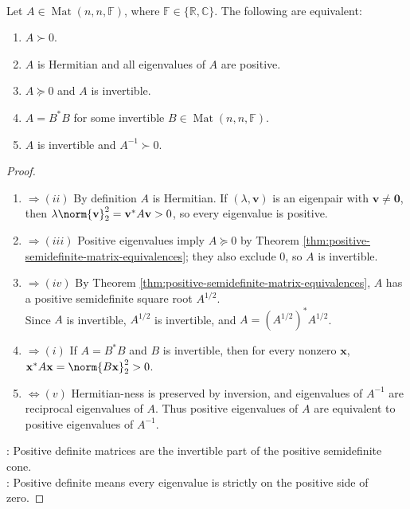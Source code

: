 \begin{theorem} \label{thm:positive-definite-matrix-equivalences} \\
Let $A\in\operatorname{Mat}(n,n,\mathbb{F})$, where $\mathbb{F}\in\{\mathbb{R},\mathbb{C}\}$. The following are equivalent:
\begin{enumerate}[label=(\roman*)]
\setlength{\itemsep}{0pt}
\item $A\succ0$.
\item $A$ is Hermitian and all eigenvalues of $A$ are positive.
\item $A\succeq0$ and $A$ is invertible.
\item $A=B^*B$ for some invertible $B\in\operatorname{Mat}(n,n,\mathbb{F})$.
\item $A$ is invertible and $A^{-1}\succ0$.
\end{enumerate}
\begin{proof}
\begin{enumerate}[label=(\roman*).]
\setlength{\itemsep}{0pt}
\item[$(i)$]$\Rightarrow (ii)$ By definition $A$ is Hermitian. If $(\lambda,\mathbf{v})$ is an eigenpair with $\mathbf{v}\neq\mathbf{0}$, then $\lambda\norm{\mathbf{v}}_2^2=\mathbf{v}^*A\mathbf{v}>0$, so every eigenvalue is positive.
\item[$(ii)$]$\Rightarrow (iii)$ Positive eigenvalues imply $A\succeq0$ by Theorem \ref{thm:positive-semidefinite-matrix-equivalences}; they also exclude $0$, so $A$ is invertible.
\item[$(iii)$]$\Rightarrow (iv)$ By Theorem \ref{thm:positive-semidefinite-matrix-equivalences}, $A$ has a positive semidefinite square root $A^{1/2}$.\\
Since $A$ is invertible, $A^{1/2}$ is invertible, and $A=(A^{1/2})^*A^{1/2}$.
\item[$(iv)$]$\Rightarrow (i)$ If $A=B^*B$ and $B$ is invertible, then for every nonzero $\mathbf{x}$, $\mathbf{x}^*A\mathbf{x}=\norm{B\mathbf{x}}_2^2>0$.
\item[$(ii)$]$\Leftrightarrow (v)$ Hermitian-ness is preserved by inversion, and eigenvalues of $A^{-1}$ are reciprocal eigenvalues of $A$. Thus positive eigenvalues of $A$ are equivalent to positive eigenvalues of $A^{-1}$.
\end{enumerate}
: Positive definite matrices are the invertible part of the positive semidefinite cone.\\
: Positive definite means every eigenvalue is strictly on the positive side of zero.
\end{proof}
\end{theorem}

